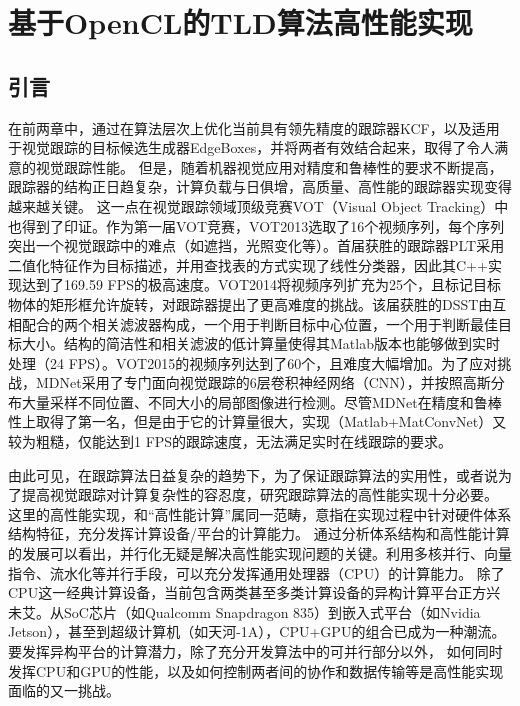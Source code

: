 \chapter{基于OpenCL的TLD算法高性能实现}
\section{引言}
在前两章中，通过在算法层次上优化当前具有领先精度的跟踪器KCF，以及适用于视觉跟踪的目标候选生成器EdgeBoxes，并将两者有效结合起来，取得了令人满意的视觉跟踪性能。
但是，随着机器视觉应用对精度和鲁棒性的要求不断提高，跟踪器的结构正日趋复杂，计算负载与日俱增，高质量、高性能的跟踪器实现变得越来越关键。
这一点在视觉跟踪领域顶级竞赛VOT（Visual Object Tracking）中也得到了印证。作为第一届VOT竞赛，VOT2013选取了16个视频序列，每个序列突出一个视觉跟踪中的难点（如遮挡，光照变化等）。首届获胜的跟踪器PLT采用二值化特征作为目标描述，并用查找表的方式实现了线性分类器，因此其C++实现达到了169.59 FPS的极高速度。VOT2014将视频序列扩充为25个，且标记目标物体的矩形框允许旋转，对跟踪器提出了更高难度的挑战。该届获胜的DSST由互相配合的两个相关滤波器构成，一个用于判断目标中心位置，一个用于判断最佳目标大小。结构的简洁性和相关滤波的低计算量使得其Matlab版本也能够做到实时处理（24 FPS）。VOT2015的视频序列达到了60个，且难度大幅增加。为了应对挑战，MDNet采用了专门面向视觉跟踪的6层卷积神经网络（CNN），并按照高斯分布大量采样不同位置、不同大小的局部图像进行检测。尽管MDNet在精度和鲁棒性上取得了第一名，但是由于它的计算量很大，实现（Matlab+MatConvNet）又较为粗糙，仅能达到1 FPS的跟踪速度，无法满足实时在线跟踪的要求。

由此可见，在跟踪算法日益复杂的趋势下，为了保证跟踪算法的实用性，或者说为了提高视觉跟踪对计算复杂性的容忍度，研究跟踪算法的高性能实现十分必要。
这里的高性能实现，和``高性能计算''属同一范畴，意指在实现过程中针对硬件体系结构特征，充分发挥计算设备/平台的计算能力。
通过分析体系结构和高性能计算的发展可以看出，并行化无疑是解决高性能实现问题的关键。利用多核并行、向量指令、流水化等并行手段，可以充分发挥通用处理器（CPU）的计算能力。
除了CPU这一经典计算设备，当前包含两类甚至多类计算设备的异构计算平台正方兴未艾。从SoC芯片（如Qualcomm Snapdragon 835）到嵌入式平台（如Nvidia Jetson），甚至到超级计算机（如天河-1A），CPU+GPU的组合已成为一种潮流。要发挥异构平台的计算潜力，除了充分开发算法中的可并行部分以外，
如何同时发挥CPU和GPU的性能，以及如何控制两者间的协作和数据传输等是高性能实现面临的又一挑战。


